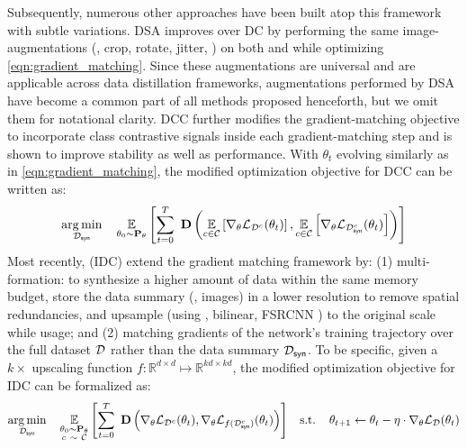 \documentclass[10pt]{article} %
\begin{document}
Subsequently, numerous other approaches have been built atop this framework with subtle variations. DSA \citep{zhao_dsa} improves over DC by performing the same image-augmentations (\eg, crop, rotate, jitter, \etc) on both \dataset and \distill while optimizing \cref{eqn:gradient_matching}. Since these augmentations are universal and are applicable across data distillation frameworks, augmentations performed by DSA have become a common part of all methods proposed henceforth, but we omit them for notational clarity. DCC \citep{dcc} further modifies the gradient-matching objective to incorporate class contrastive signals inside each gradient-matching step and is shown to improve stability as well as performance. With $\theta_t$ evolving similarly as in \cref{eqn:gradient_matching}, the modified optimization objective for DCC can be written as:
\begin{equation} \label{eqn:dcc_gradient_matching}
\begin{gathered}
    \underset{\mathcal{D}_{\mathsf{syn}}}{\operatorname{arg} \operatorname{min}} \hspace{0.4cm} \underset{\theta_0 \sim \mathbf{P}_\theta}{\mathbb{E}} \left[\sum_{t=0}^T ~ \mathbf{D}\left( \underset{c \in \mathcal{C}}{\mathbb{E}} \left[ \nabla_\theta \mathcal{L}_{\mathcal{D}^c}(\theta_t)\right], \underset{c \in \mathcal{C}}{\mathbb{E}} \left[\nabla_\theta \mathcal{L}_{\mathcal{D}_{\mathsf{syn}}^c}(\theta_t)\right] \right)\right]
\end{gathered}
\end{equation}
Most recently, \citet{idc} (IDC) extend the gradient matching framework by: (1) multi-formation: to synthesize a higher amount of data within the same memory budget, store the data summary (\eg, images) in a lower resolution to remove spatial redundancies, and upsample (using \eg, bilinear, FSRCNN \citep{fsrcnn}) to the original scale while usage; and (2) matching gradients of the network's training trajectory over the full dataset $\mathcal{D}$ rather than the data summary $\mathcal{D}_{\mathsf{syn}}$. To be specific, given a $k \times$ upscaling function $f : \mathbb{R}^{d \times d} \mapsto \mathbb{R}^{kd \times kd}$, the modified optimization objective for IDC can be formalized as:
\begin{equation} \label{eqn:idc_gradient_matching}
\begin{gathered}
    \underset{\mathcal{D}_{\mathsf{syn}}}{\operatorname{arg} \operatorname{min}} \hspace{0.4cm} \underset{\substack{\theta_0 \sim \mathbf{P}_\theta\\c ~\sim~ \mathcal{C}}}{\mathbb{E}} \left[\sum_{t=0}^T ~ \mathbf{D}\left( \nabla_\theta \mathcal{L}_{\mathcal{D}^c}(\theta_t), \nabla_\theta \mathcal{L}_{f(\mathcal{D}_{\mathsf{syn}}^c)}(\theta_t) \right)\right] \hspace{0.3cm}
    \text{s.t.} \hspace{0.4cm} \theta_{t+1} \leftarrow \theta_t - \eta \cdot \nabla_\theta \mathcal{L}_{\mathcal{D}}(\theta_t)
\end{gathered}
\end{equation}
\end{document}
